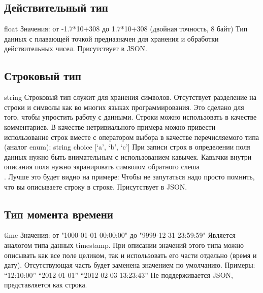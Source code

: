 {{\subsection{Действительный тип}
float
Значения: от -1.7*10+308 до 1.7*10+308 (двойная точность, 8 байт)
Тип данных с плавающей точкой предназначен для хранения и обработки действительных чисел.
Присутствует в JSON.

\subsection{Строковый тип}
string
Строковый тип служит для хранения символов. Отсутствует разделение на строки и символы как во многих языках программирования. Это сделано для того, чтобы упростить работу с данными. Строки можно использовать в качестве комментариев. В качестве нетривиального примера можно привести использование строк вместе с оператором выбора в качестве перечисляемого типа (аналог enum):
        string choice [‘a’, ‘b’, ‘c’]
При записи строк в определении поля данных нужно быть внимательным с использованием кавычек. Кавычки внутри описания поля нужно экранировать символом обратного слеша \\. Лучше это будет видно на примере:
Чтобы не запутаться надо просто помнить, что вы описываете строку в строке.
Присутствует в JSON.

\subsection{Тип момента времени}
time
Значения: от "1000-01-01 00:00:00" до "9999-12-31 23:59:59"
Является аналогом типа данных timestamp. При описании значений этого типа можно описывать как все поле целиком, так и использовать его части отдельно (время и дату). Отсутствующая часть будет заменена значением по умолчанию. Примеры:
        “12:10:00”
        “2012-01-01”
        “2012-02-03 13:23:43”
Не поддерживается JSON, представляется как строка.

}}
